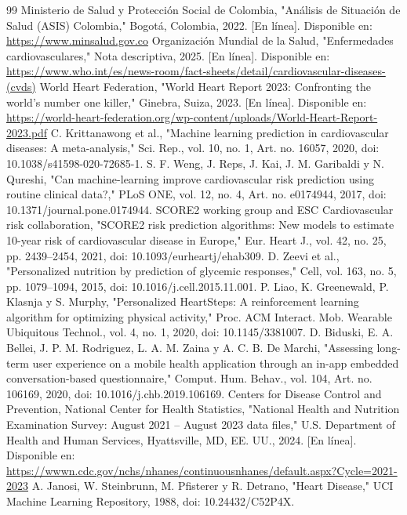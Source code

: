 \documentclass[conference]{IEEEtran}
\begin{document}
\begin{thebibliography}{99}
 Ministerio de Salud y Protección Social de Colombia, "Análisis de Situación de Salud (ASIS) Colombia," Bogotá, Colombia, 2022. [En línea]. Disponible en: \url{https://www.minsalud.gov.co}
 Organización Mundial de la Salud, "Enfermedades cardiovasculares," Nota descriptiva, 2025. [En línea]. Disponible en: \url{https://www.who.int/es/news-room/fact-sheets/detail/cardiovascular-diseases-(cvds)}
 World Heart Federation, "World Heart Report 2023: Confronting the world's number one killer," Ginebra, Suiza, 2023. [En línea]. Disponible en: \url{https://world-heart-federation.org/wp-content/uploads/World-Heart-Report-2023.pdf}
 C. Krittanawong et al., "Machine learning prediction in cardiovascular diseases: A meta-analysis," Sci. Rep., vol. 10, no. 1, Art. no. 16057, 2020, doi: 10.1038/s41598-020-72685-1.
 S. F. Weng, J. Reps, J. Kai, J. M. Garibaldi y N. Qureshi, "Can machine-learning improve cardiovascular risk prediction using routine clinical data?," PLoS ONE, vol. 12, no. 4, Art. no. e0174944, 2017, doi: 10.1371/journal.pone.0174944.
 SCORE2 working group and ESC Cardiovascular risk collaboration, "SCORE2 risk prediction algorithms: New models to estimate 10-year risk of cardiovascular disease in Europe," Eur. Heart J., vol. 42, no. 25, pp. 2439--2454, 2021, doi: 10.1093/eurheartj/ehab309.
 D. Zeevi et al., "Personalized nutrition by prediction of glycemic responses," Cell, vol. 163, no. 5, pp. 1079--1094, 2015, doi: 10.1016/j.cell.2015.11.001.
 P. Liao, K. Greenewald, P. Klasnja y S. Murphy, "Personalized HeartSteps: A reinforcement learning algorithm for optimizing physical activity," Proc. ACM Interact. Mob. Wearable Ubiquitous Technol., vol. 4, no. 1, 2020, doi: 10.1145/3381007.
 D. Biduski, E. A. Bellei, J. P. M. Rodriguez, L. A. M. Zaina y A. C. B. De Marchi, "Assessing long-term user experience on a mobile health application through an in-app embedded conversation-based questionnaire," Comput. Hum. Behav., vol. 104, Art. no. 106169, 2020, doi: 10.1016/j.chb.2019.106169.
 Centers for Disease Control and Prevention, National Center for Health Statistics, "National Health and Nutrition Examination Survey: August 2021 -- August 2023 data files," U.S. Department of Health and Human Services, Hyattsville, MD, EE. UU., 2024. [En línea]. Disponible en: \url{https://wwwn.cdc.gov/nchs/nhanes/continuousnhanes/default.aspx?Cycle=2021-2023}
 A. Janosi, W. Steinbrunn, M. Pfisterer y R. Detrano, "Heart Disease," UCI Machine Learning Repository, 1988, doi: 10.24432/C52P4X.

\end{thebibliography}
\end{document}
